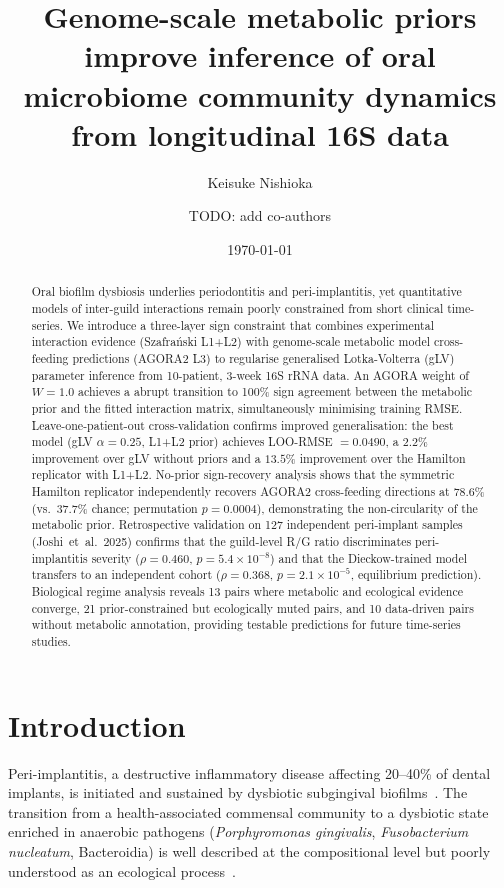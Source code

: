 \documentclass[11pt,a4paper]{article}
\title{Genome-scale metabolic priors improve inference of oral microbiome
       community dynamics from longitudinal 16S data}
\author[1]{Keisuke Nishioka}
\author[1]{TODO: add co-authors}
\affil[1]{TODO: affiliation}
\date{\today}
\begin{document}
\maketitle

\begin{abstract}
Oral biofilm dysbiosis underlies periodontitis and peri-implantitis, yet
quantitative models of inter-guild interactions remain poorly constrained from
short clinical time-series.
We introduce a three-layer sign constraint that combines experimental interaction
evidence (Szafra\'{n}ski L1+L2) with genome-scale metabolic model
cross-feeding predictions (AGORA2 L3) to regularise generalised Lotka-Volterra
(gLV) parameter inference from 10-patient, 3-week 16S rRNA data.
An AGORA weight of $W{=}1.0$ achieves a abrupt transition to 100\% sign
agreement between the metabolic prior and the fitted interaction matrix,
simultaneously minimising training RMSE.
Leave-one-patient-out cross-validation confirms improved generalisation:
the best model (gLV $\alpha{=}0.25$, L1+L2 prior) achieves LOO-RMSE
$=0.0490$, a $2.2\%$ improvement over gLV without priors and a $13.5\%$
improvement over the Hamilton replicator with L1+L2.
No-prior sign-recovery analysis shows that the symmetric Hamilton replicator
independently recovers AGORA2 cross-feeding directions at 78.6\% (vs.\ 37.7\%
chance; permutation $p{=}0.0004$), demonstrating the non-circularity of the
metabolic prior.
Retrospective validation on 127 independent peri-implant samples
(Joshi~et~al.\ 2025) confirms that the guild-level R/G ratio discriminates
peri-implantitis severity ($\rho{=}0.460$, $p{=}5.4{\times}10^{-8}$) and
that the Dieckow-trained model transfers to an independent cohort
($\rho{=}0.368$, $p{=}2.1{\times}10^{-5}$, equilibrium prediction).
Biological regime analysis reveals 13 pairs where metabolic and ecological
evidence converge, 21 prior-constrained but ecologically muted pairs, and 10
data-driven pairs without metabolic annotation, providing testable predictions
for future time-series studies.
\end{abstract}

\section{Introduction}
\label{sec:intro}

Peri-implantitis, a destructive inflammatory disease affecting 20--40\% of
dental implants, is initiated and sustained by dysbiotic subgingival
biofilms~\citep{berglundh2018}.
The transition from a health-associated commensal community to a dysbiotic
state enriched in anaerobic pathogens (\textit{Porphyromonas gingivalis},
\textit{Fusobacterium nucleatum}, Bacteroidia) is well described at the
compositional level but poorly understood as an ecological process~\citep{kolenbrander2010}.
\end{document}

